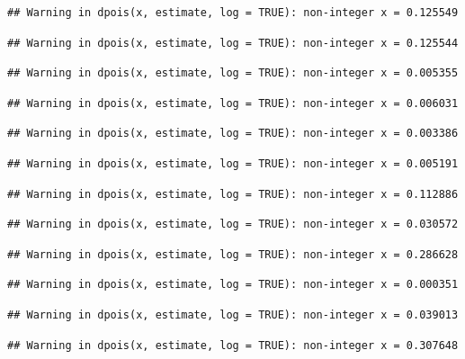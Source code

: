 \documentclass[]{article}
\begin{document}
\begin{verbatim}
## Warning in dpois(x, estimate, log = TRUE): non-integer x = 0.125549
\end{verbatim}

\begin{verbatim}
## Warning in dpois(x, estimate, log = TRUE): non-integer x = 0.125544
\end{verbatim}

\begin{verbatim}
## Warning in dpois(x, estimate, log = TRUE): non-integer x = 0.005355
\end{verbatim}

\begin{verbatim}
## Warning in dpois(x, estimate, log = TRUE): non-integer x = 0.006031
\end{verbatim}

\begin{verbatim}
## Warning in dpois(x, estimate, log = TRUE): non-integer x = 0.003386
\end{verbatim}

\begin{verbatim}
## Warning in dpois(x, estimate, log = TRUE): non-integer x = 0.005191
\end{verbatim}

\begin{verbatim}
## Warning in dpois(x, estimate, log = TRUE): non-integer x = 0.112886
\end{verbatim}

\begin{verbatim}
## Warning in dpois(x, estimate, log = TRUE): non-integer x = 0.030572
\end{verbatim}

\begin{verbatim}
## Warning in dpois(x, estimate, log = TRUE): non-integer x = 0.286628
\end{verbatim}

\begin{verbatim}
## Warning in dpois(x, estimate, log = TRUE): non-integer x = 0.000351
\end{verbatim}

\begin{verbatim}
## Warning in dpois(x, estimate, log = TRUE): non-integer x = 0.039013
\end{verbatim}

\begin{verbatim}
## Warning in dpois(x, estimate, log = TRUE): non-integer x = 0.307648
\end{verbatim}
\end{document}

